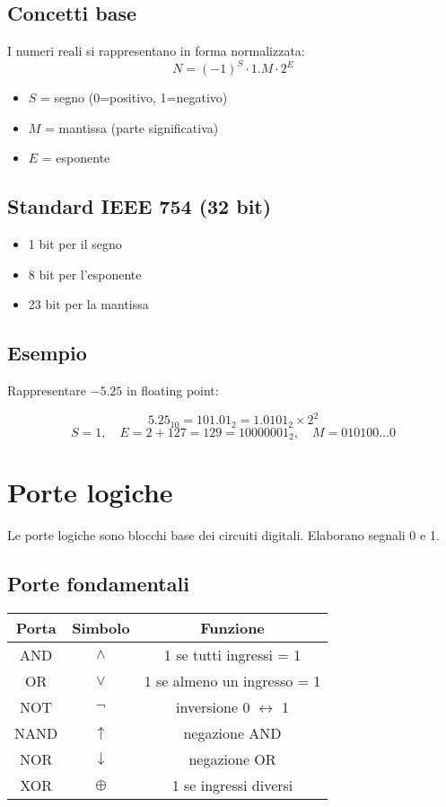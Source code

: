 \documentclass[12pt,a4paper]{article}
\begin{document}
\subsection{Concetti base}

I numeri reali si rappresentano in forma normalizzata:
\[
N = (-1)^S \cdot 1.M \cdot 2^E
\]

\begin{itemize}
    \item $S$ = segno (0=positivo, 1=negativo)
    \item $M$ = mantissa (parte significativa)
    \item $E$ = esponente
\end{itemize}

\subsection{Standard IEEE 754 (32 bit)}

\begin{itemize}
    \item 1 bit per il segno
    \item 8 bit per l’esponente
    \item 23 bit per la mantissa
\end{itemize}

\subsection{Esempio}

Rappresentare $-5.25$ in floating point:

\[
5.25_{10} = 101.01_2 = 1.0101_2 \times 2^2
\]
\[
S=1, \quad E=2+127=129=10000001_2, \quad M=010100\ldots0
\]

\newpage
\section{Porte logiche}

Le porte logiche sono blocchi base dei circuiti digitali. Elaborano segnali 0 e 1.

\subsection{Porte fondamentali}

\begin{longtable}{|c|c|c|}
\hline
Porta & Simbolo & Funzione \\
\hline
AND & $\land$ & 1 se tutti ingressi = 1 \\
OR & $\lor$ & 1 se almeno un ingresso = 1 \\
NOT & $\lnot$ & inversione 0 $\leftrightarrow$ 1 \\
NAND & $\uparrow$ & negazione AND \\
NOR & $\downarrow$ & negazione OR \\
XOR & $\oplus$ & 1 se ingressi diversi \\
\hline
\end{longtable}
\end{document}
